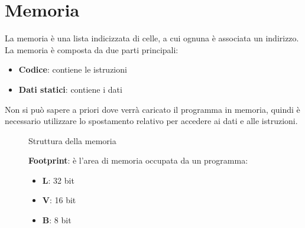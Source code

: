 \documentclass[a4paper]{article}
\theoremstyle{break}
\theoremstyle{break}
\theoremstyle{break}
\theoremstyle{break}
\begin{document}
\section{Memoria}
La memoria è una lista indicizzata di celle, a cui ognuna è associata un indirizzo.
La memoria è composta da due parti principali:
\begin{itemize}
	\item \textbf{Codice}: contiene le istruzioni
	\item \textbf{Dati statici}: contiene i dati
\end{itemize}

\noindent Non si può sapere a priori dove verrà caricato il programma in memoria, quindi
è necessario utilizzare lo spostamento relativo per accedere ai dati e alle istruzioni.

\begin{figure}[H]
	\centering
	\caption{Struttura della memoria}
\end{figure}

\begin{figure}[H]
	\begin{define}
		\textbf{Footprint}: è l'area di memoria occupata da un programma:
		\begin{itemize}
			\item \textbf{L}: 32 bit
			\item \textbf{V}: 16 bit
			\item \textbf{B}: 8 bit
		\end{itemize}
	\end{define}
\end{figure}
\end{document}
